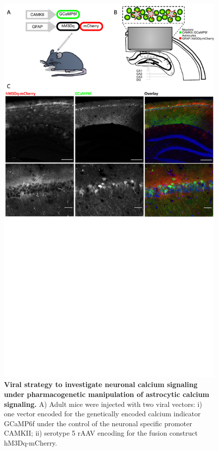 \begin{figure}[h!]
    \centering
    \includegraphics[trim={0 300 0 0},clip,width=\textwidth]{Figures/Chapter4/Pedro_fig5.pdf}
    \caption[Viral strategy to investigate neuronal calcium signaling under pharmacogenetic manipulation of astrocytic calcium signaling.]{\textbf{Viral strategy to investigate neuronal calcium signaling under pharmacogenetic manipulation of astrocytic calcium signaling.} 
    A) Adult mice were injected with two viral vectors: i) one vector encoded for the genetically encoded calcium indicator GCaMP6f under the control of the neuronal specific promoter CAMKII; ii) serotype 5 rAAV encoding for the fusion construct hM3Dq-mCherry. 
}
\end{figure}
